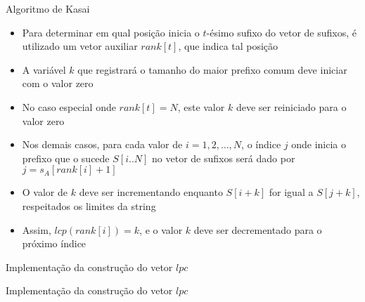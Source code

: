 \begin{frame}[fragile]{Algoritmo de Kasai}

    \begin{itemize}
        \item Para determinar em qual posição inicia o $t$-ésimo sufixo do vetor de sufixos,
            é utilizado um vetor auxiliar $rank[t]$, que indica tal posição

        \item A variável $k$ que registrará o tamanho do maior prefixo comum deve iniciar com
            o valor zero

        \item No caso especial onde $rank[t] = N$, este valor $k$ deve ser reiniciado para
            o valor zero

        \item Nos demais casos, para cada valor de $i = 1, 2, \ldots, N$, o índice $j$ onde inicia
            o prefixo que o sucede $S[i..N]$ no vetor de sufixos será dado por 
                $j = s_A[rank[i] + 1]$

        \item O valor de $k$ deve ser incrementando enquanto $S[i + k]$ for igual a $S[j + k]$,
            respeitados os limites da string

        \item Assim, $lcp(rank[i]) = k$, e o valor $k$ deve ser decrementado para o próximo
            índice
    \end{itemize}

\end{frame}



\begin{frame}[fragile]{Implementação da construção do vetor $lpc$}
\end{frame}

\begin{frame}[fragile]{Implementação da construção do vetor $lpc$}
\end{frame}

